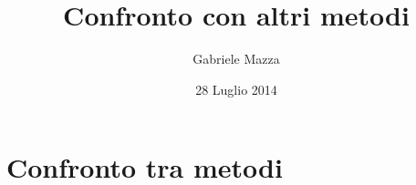\documentclass[a4paper,11pt,twoside,openright]{book}							%
\date{28 Luglio 2014}
\author{Gabriele Mazza}
\title{Confronto con altri metodi}
\begin{document}

\chapter{Confronto tra metodi}
\end{document}
